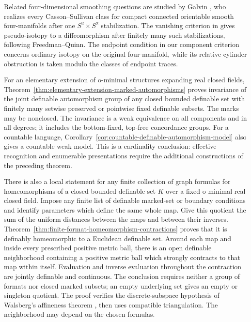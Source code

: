 \documentclass[11pt,a4paper]{article}
\theoremstyle{definition}
\begin{document}
Related four-dimensional smoothing questions are studied by Galvin
\cite[Theorem~1.1, p.~2497]{Galvin2026CassonSullivan}, who realizes every
Casson--Sullivan class for compact connected orientable smooth
four-manifolds after one $S^2\times S^2$ stabilization. The vanishing
criterion in \cite[Proposition~2.27, pp.~2510--2511]{Galvin2026CassonSullivan}
gives pseudo-isotopy to a diffeomorphism after finitely many such
stabilizations, following Freedman--Quinn. The endpoint condition in
our component criterion concerns ordinary isotopy on the original
four-manifold, while its relative cylinder obstruction is taken
modulo the classes of endpoint traces.

For an elementary extension of o-minimal structures expanding real
closed fields, Theorem~\ref{thm:elementary-extension-marked-automorphisms}
proves invariance of the joint definable automorphism group of any
closed bounded definable set with finitely many setwise preserved or
pointwise fixed definable subsets. The marks may be nonclosed. The
invariance is a weak equivalence on all components and in all degrees;
it includes the bottom-fixed, top-free concordance groups. For a
countable language, Corollary~\ref{cor:countable-definable-automorphism-model}
also gives a countable weak model. This is a cardinality conclusion:
effective recognition and enumerable presentations require the
additional constructions of the preceding theorem.

There is also a local statement for any finite collection of graph
formulas for homeomorphisms of a closed bounded definable set $K$
over a fixed o-minimal real closed field. Impose any finite list of
definable marked-set or boundary conditions and identify parameters
which define the same whole map. Give this quotient the sum of the
uniform distances between the maps and between their inverses.
Theorem~\ref{thm:finite-format-homeomorphism-contractions} proves that
it is definably homeomorphic to a Euclidean definable set. Around
each map and inside every prescribed positive metric ball, there is
an open definable neighborhood containing a positive metric ball
which strongly contracts to that map within itself. Evaluation and
inverse evaluation throughout the contraction are jointly definable
and continuous. The conclusion requires neither a group of formats
nor closed marked subsets; an empty underlying set gives an empty
or singleton quotient. The proof verifies the discrete-subspace
hypothesis of Walsberg's affineness theorem
\cite[Theorem~7.1, p.~16]{Walsberg2015}, then uses compatible triangulation.
The neighborhood may depend on the chosen formulas.
\end{document}
